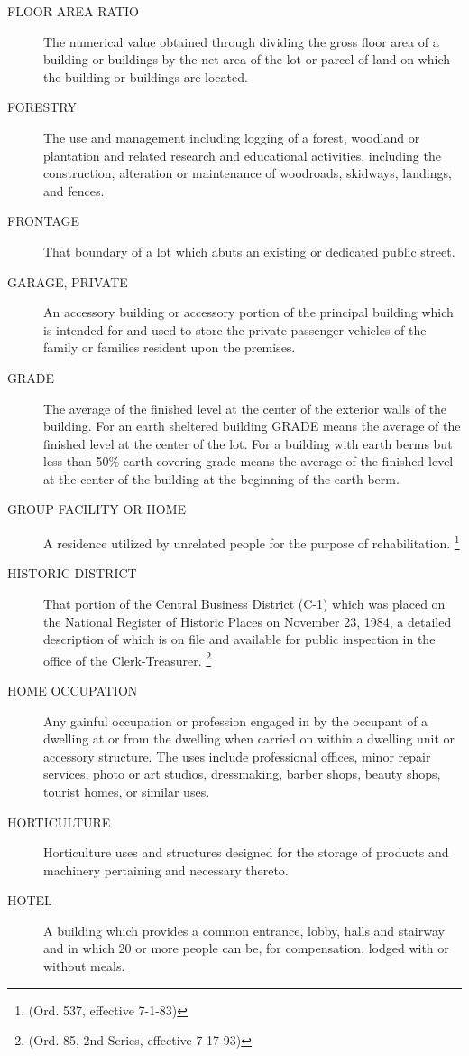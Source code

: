 \begin{description}
    \item[FLOOR AREA RATIO] The numerical value obtained through dividing the gross floor area of a building or buildings by the net area of the lot or parcel of land on which the building or buildings are located.
    \item[FORESTRY] The use and management including logging of a forest, woodland or plantation and related research and educational activities, including the construction, alteration or maintenance of woodroads, skidways, landings, and fences.
    \item[FRONTAGE] That boundary of a lot which abuts an existing or dedicated public street.
    \item[GARAGE, PRIVATE] An accessory building or accessory portion of the principal building which is intended for and used to store the private passenger vehicles of the family or families resident upon the premises.
    \item[GRADE] The average of the finished level at the center of the exterior walls of the building.  For an earth sheltered building GRADE means the average of the finished level at the center of the lot.  For a building with earth berms but less than 50\% earth covering grade means the average of the finished level at the center of the building at the beginning of the earth berm.
    \item[GROUP FACILITY OR HOME] A residence utilized by unrelated people for the purpose of rehabilitation. \footnote{(Ord. 537, effective 7-1-83)}
    \item[HISTORIC DISTRICT] That portion of the Central Business District (C-1) which was placed on the National Register of Historic Places on November 23, 1984, a detailed description of which is on file and available for public inspection in the office of the Clerk-Treasurer. \footnote{(Ord. 85, 2nd Series, effective 7-17-93)}
    \item[HOME OCCUPATION] Any gainful occupation or profession engaged in by the occupant of a dwelling at or from the dwelling when carried on within a dwelling unit or accessory structure.  The uses include professional offices, minor repair services, photo or art studios, dressmaking, barber shops, beauty shops, tourist homes, or similar uses.
    \item[HORTICULTURE] Horticulture uses and structures designed for the storage of products and machinery pertaining and necessary thereto.
    \item[HOTEL] A building which provides a common entrance, lobby, halls and stairway and in which 20 or more people can be, for compensation, lodged with or without meals.

\end{description}

